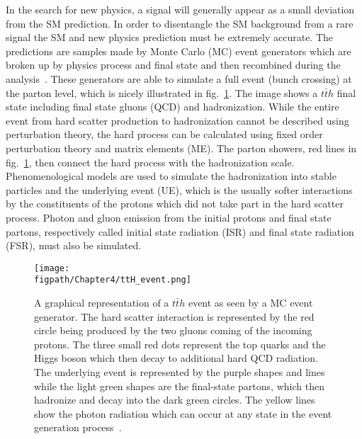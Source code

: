 In the search for new physics, a signal will generally appear as a small deviation from the SM prediction.
In order to disentangle the SM background from a rare signal the SM and new physics prediction must be extremely accurate.
The predictions are samples made by Monte Carlo (MC) event generators which are broken up by physics process and final state and then recombined during the analysis~\cite{Siegert:2010cru,Mangano:2005dj,Dobbs:2004qw}.
These generators are able to simulate a full event (bunch crossing) at the parton level, which is nicely illustrated in fig.~\ref{fig:ttH_event}.
The image shows a $t\bar{t}h$ final state including final state gluons (QCD) and hadronization.
While the entire event from hard scatter production to hadronization cannot be described using perturbation theory, the hard process can be calculated using fixed order perturbation theory and matrix elements (ME).
The parton showers, red lines in fig.~\ref{fig:ttH_event}, then connect the hard process with the hadronization scale.
Phenomenological models are used to simulate the hadronization into stable particles and the underlying event (UE), which is the usually softer interactions by the constituents of the protons which did not take part in the hard scatter process.
Photon and gluon emission from the initial protons and final state partons, respectively called initial state radiation (ISR) and final state radiation (FSR), must also be simulated.

\begin{figure}[!hbt]
    \vspace*{-0.5cm}
    \centering
    \texttt{[image: \\figpath/Chapter4/ttH\_event.png]}
    \caption{A graphical representation of a $t\bar{t}h$ event as seen by a MC event generator. The hard scatter interaction is represented by the red circle being produced by the two gluons coming of the incoming protons. The three small red dots represent the top quarks and the Higgs boson which then decay to additional hard QCD radiation. The underlying event is represented by the purple shapes and lines while the light green shapes are the final-state partons, which then hadronize and decay into the dark green circles. The yellow lines show the photon radiation which can occur at any state in the event generation process~\cite{Siegert:2010cru}.}
    \label{fig:ttH_event}
\end{figure}

